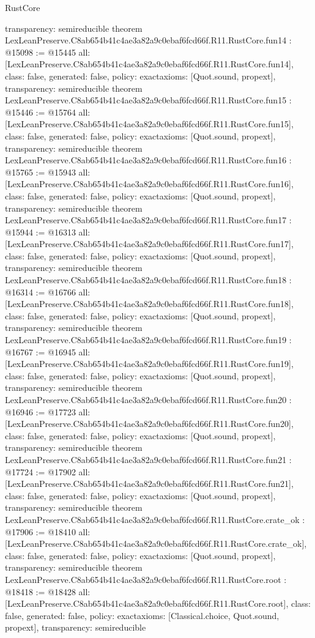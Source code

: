 \begin{lexlean}{RustCore}
\begin{coremodule}
{  transparency: semireducible
}
theorem LexLeanPreserve.C8ab654b41c4ae3a82a9c0ebaf6fcd66f.R11.RustCore.fun14 : @15098 := @15445 {
  all: [LexLeanPreserve.C8ab654b41c4ae3a82a9c0ebaf6fcd66f.R11.RustCore.fun14],
  class: false,
  generated: false,
  policy: exact{axioms: [Quot.sound, propext]},
  transparency: semireducible
}
theorem LexLeanPreserve.C8ab654b41c4ae3a82a9c0ebaf6fcd66f.R11.RustCore.fun15 : @15446 := @15764 {
  all: [LexLeanPreserve.C8ab654b41c4ae3a82a9c0ebaf6fcd66f.R11.RustCore.fun15],
  class: false,
  generated: false,
  policy: exact{axioms: [Quot.sound, propext]},
  transparency: semireducible
}
theorem LexLeanPreserve.C8ab654b41c4ae3a82a9c0ebaf6fcd66f.R11.RustCore.fun16 : @15765 := @15943 {
  all: [LexLeanPreserve.C8ab654b41c4ae3a82a9c0ebaf6fcd66f.R11.RustCore.fun16],
  class: false,
  generated: false,
  policy: exact{axioms: [Quot.sound, propext]},
  transparency: semireducible
}
theorem LexLeanPreserve.C8ab654b41c4ae3a82a9c0ebaf6fcd66f.R11.RustCore.fun17 : @15944 := @16313 {
  all: [LexLeanPreserve.C8ab654b41c4ae3a82a9c0ebaf6fcd66f.R11.RustCore.fun17],
  class: false,
  generated: false,
  policy: exact{axioms: [Quot.sound, propext]},
  transparency: semireducible
}
theorem LexLeanPreserve.C8ab654b41c4ae3a82a9c0ebaf6fcd66f.R11.RustCore.fun18 : @16314 := @16766 {
  all: [LexLeanPreserve.C8ab654b41c4ae3a82a9c0ebaf6fcd66f.R11.RustCore.fun18],
  class: false,
  generated: false,
  policy: exact{axioms: [Quot.sound, propext]},
  transparency: semireducible
}
theorem LexLeanPreserve.C8ab654b41c4ae3a82a9c0ebaf6fcd66f.R11.RustCore.fun19 : @16767 := @16945 {
  all: [LexLeanPreserve.C8ab654b41c4ae3a82a9c0ebaf6fcd66f.R11.RustCore.fun19],
  class: false,
  generated: false,
  policy: exact{axioms: [Quot.sound, propext]},
  transparency: semireducible
}
theorem LexLeanPreserve.C8ab654b41c4ae3a82a9c0ebaf6fcd66f.R11.RustCore.fun20 : @16946 := @17723 {
  all: [LexLeanPreserve.C8ab654b41c4ae3a82a9c0ebaf6fcd66f.R11.RustCore.fun20],
  class: false,
  generated: false,
  policy: exact{axioms: [Quot.sound, propext]},
  transparency: semireducible
}
theorem LexLeanPreserve.C8ab654b41c4ae3a82a9c0ebaf6fcd66f.R11.RustCore.fun21 : @17724 := @17902 {
  all: [LexLeanPreserve.C8ab654b41c4ae3a82a9c0ebaf6fcd66f.R11.RustCore.fun21],
  class: false,
  generated: false,
  policy: exact{axioms: [Quot.sound, propext]},
  transparency: semireducible
}
theorem LexLeanPreserve.C8ab654b41c4ae3a82a9c0ebaf6fcd66f.R11.RustCore.crate_ok : @17906 := @18410 {
  all: [LexLeanPreserve.C8ab654b41c4ae3a82a9c0ebaf6fcd66f.R11.RustCore.crate_ok],
  class: false,
  generated: false,
  policy: exact{axioms: [Quot.sound, propext]},
  transparency: semireducible
}
theorem LexLeanPreserve.C8ab654b41c4ae3a82a9c0ebaf6fcd66f.R11.RustCore.root : @18418 := @18428 {
  all: [LexLeanPreserve.C8ab654b41c4ae3a82a9c0ebaf6fcd66f.R11.RustCore.root],
  class: false,
  generated: false,
  policy: exact{axioms: [Classical.choice, Quot.sound, propext]},
  transparency: semireducible
}


\end{coremodule}
\end{lexlean}

